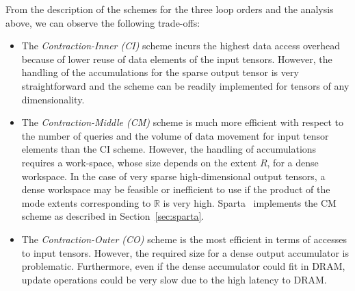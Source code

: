 From the description of the schemes for the three loop orders and the analysis above, we can observe the following trade-offs:
\begin{itemize}
    \item The {\em Contraction-Inner (CI)} scheme incurs the highest data access overhead because of lower reuse of data elements of the input tensors. However, the handling of the accumulations for the sparse output tensor is very straightforward and the scheme can be readily implemented for tensors of any dimensionality. 
    \item The {\em Contraction-Middle (CM)} scheme is much more efficient with respect to the number of queries and the volume of data movement for input tensor elements than the CI scheme. However, the handling of accumulations requires a work-space, whose size depends on the extent $R$, for a dense workspace. 
    In the case of very sparse high-dimensional output tensors, a dense workspace may be feasible or inefficient to use
    if the product of the mode extents corresponding to $\mathbb{R}$ is 
    very high. Sparta~\cite{liu2021sparta} implements the CM scheme as described in Section~\ref{sec:sparta}.
    \item The {\em Contraction-Outer (CO)} scheme is the most efficient in terms of accesses to input tensors. However, the required size for a dense output accumulator is problematic. Furthermore, even if the dense accumulator could fit in DRAM, update operations could be very slow due to the high latency to DRAM. 
\end{itemize}



